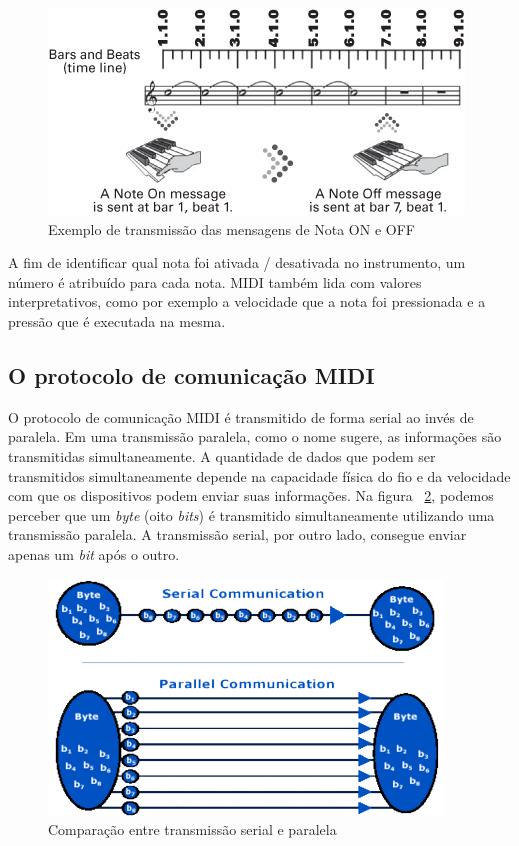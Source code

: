             \begin{figure}[!h]
            	\centering
            	\includegraphics{Imagens/MIDI_Nota_ON_e_OFF.jpg}
            	\caption[Exemplo de transmissão das mensagens de Nota ON e OFF]{Exemplo de transmissão das mensagens de Nota ON e OFF ~\cite{Guerin}}
            	\label{fig:MIDI_Nota_ON_e_OFF}
            \end{figure}
            
            A fim de identificar qual nota foi ativada / desativada no instrumento, um número é atribuído para cada nota. MIDI também lida com valores interpretativos, como por exemplo a velocidade que a nota foi pressionada e a pressão que é executada na mesma.
            
        \subsection{O protocolo de comunicação MIDI}
        
            O protocolo de comunicação MIDI é transmitido de forma serial ao invés de paralela. Em uma transmissão paralela, como o nome sugere, as informações são transmitidas simultaneamente. A quantidade de dados que podem ser transmitidos simultaneamente depende na capacidade física do fio e da velocidade com que os dispositivos podem enviar suas informações. Na figura ~\ref{fig:Parallel_versus_serial_transmissions}, podemos perceber que um \textit{byte} (oito \textit{bits}) é transmitido simultaneamente utilizando uma transmissão paralela. A transmissão serial, por outro lado, consegue enviar apenas um \textit{bit} após o outro.
            
            \begin{figure}[!h]
            	\centering
            	\includegraphics[scale=0.8]{Imagens/Parallel_versus_serial_transmissions.png}
            	\caption[Comparação entre transmissão serial e paralela]{Comparação entre transmissão serial e paralela}
            	\label{fig:Parallel_versus_serial_transmissions}
            \end{figure}
            
